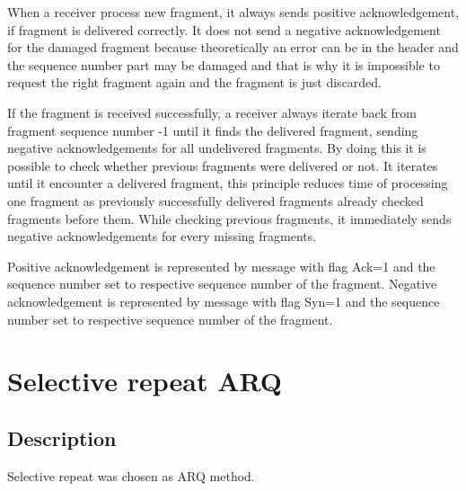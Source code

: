\documentclass{article}
\begin{document}
When a receiver process new fragment, it always sends positive acknowledgement, if fragment is delivered correctly. It does not send a negative acknowledgement for the damaged fragment because theoretically an error can be in the header and the  sequence number part may be damaged and that is why it is impossible to request the right fragment again and the fragment is just discarded.

If the fragment is received successfully, a receiver always iterate back from fragment sequence number -1 until it finds the delivered fragment, sending negative acknowledgements for all undelivered fragments. By doing this it is possible to check whether previous fragments were delivered or not. It iterates until it encounter a delivered fragment, this principle reduces time of processing one fragment as previously successfully delivered fragments already checked fragments before them. While checking previous fragments, it immediately sends negative acknowledgements for every missing fragments.

Positive acknowledgement is represented by message with flag Ack=1 and the sequence number set to respective sequence number of the fragment.
Negative acknowledgement is represented by message with flag Syn=1 and the sequence number set to respective sequence number of the fragment.



\section{Selective repeat ARQ}

\subsection{Description}
Selective repeat was chosen as ARQ method. 
\end{document}

